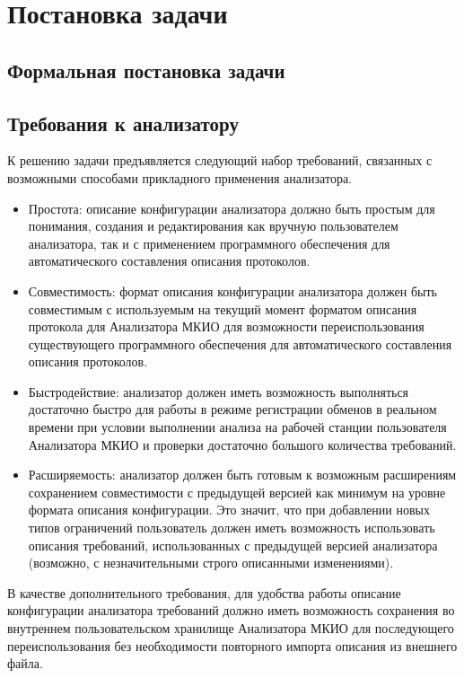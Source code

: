 \section{Постановка задачи}

\subsection{Формальная постановка задачи}

\subsection{Требования к анализатору}

К решению задачи предъявляется следующий набор требований, связанных с 
возможными способами прикладного применения анализатора.

\begin{itemize}
 \item Простота: описание конфигурации анализатора должно быть простым для 
понимания, создания и редактирования как вручную пользователем анализатора, так 
и с применением программного обеспечения для автоматического составления 
описания протоколов.
 \item Совместимость: формат описания конфигурации анализатора должен быть 
совместимым с 
используемым на текущий момент форматом описания протокола для Анализатора 
МКИО для возможности переиспользования существующего программного обеспечения 
для автоматического составления описания протоколов.
 \item Быстродействие: анализатор должен иметь возможность выполняться 
достаточно быстро для работы в режиме регистрации обменов в реальном времени при 
условии выполнении анализа на рабочей станции пользователя Анализатора МКИО и 
проверки достаточно большого количества требований.
 \item Расширяемость: анализатор должен быть готовым к возможным расширениям 
сохранением совместимости с предыдущей версией как минимум на уровне формата 
описания конфигурации. Это значит, что при добавлении новых типов ограничений 
пользователь должен иметь возможность использовать описания требований, 
использованных с предыдущей версией анализатора (возможно, с незначительными 
строго описанными изменениями).
\end{itemize}

В качестве дополнительного требования, для удобства работы описание 
конфигурации анализатора требований должно иметь возможность сохранения во 
внутреннем пользовательском хранилище Анализатора МКИО для последующего 
переиспользования без необходимости повторного импорта описания из внешнего 
файла.

